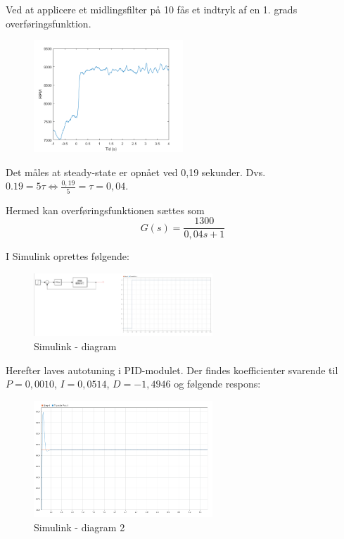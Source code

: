 Ved at applicere et midlingsfilter på 10 fås et indtryk af en 1. grads overføringsfunktion.

\begin{figure}[h]
  \centering
  \includegraphics[width=0.5\textwidth]{./figurer/mo5.png}
  \caption{}
  \label{fig:mo5}
\end{figure}

Det måles at steady-state er opnået ved 0,19 sekunder. Dvs. $0.19 = 5\tau \Leftrightarrow \frac{0,19}{5}=\tau=0,04$.

Hermed kan overføringsfunktionen sættes som
\begin{equation}
  \label{eq:1}
G(s) = \frac{1300}{0,04s+1}  
\end{equation}


I Simulink oprettes følgende:

\begin{figure}[h]
  \centering
  \includegraphics[width=0.6\textwidth]{./figurer/sbil1.png}
  \caption{Simulink - diagram}
  \label{fig:sbil1}
\end{figure}

Herefter laves autotuning i PID-modulet. Der findes koefficienter svarende til $P=0,0010$, $I=0,0514$, $D=-1,4946$ og følgende respons:

\begin{figure}[h]
  \centering
  \includegraphics[width=0.6\textwidth]{./figurer/sbil2.png}
  \caption{Simulink - diagram 2}
  \label{fig:sbil1}
\end{figure}

